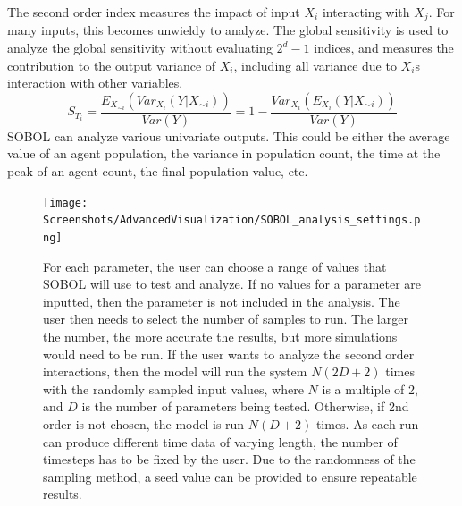 The second order index measures the impact of input $X_i$ interacting with $X_j$. For many inputs, this becomes unwieldy to analyze. 
The global sensitivity is used to analyze the global sensitivity without evaluating $2^d-1$ indices, and measures the contribution to the output variance of $X_i$, including all variance due to $X_i$s interaction with other variables. 
\[
    S_{T_i} = \frac{E_{X_{\sim i}}(Var_{X_i}(Y|X_{\sim i}))}{Var(Y)} = 1 - \frac{Var_{X_i}(E_{X_i}(Y|X_{\sim i}))}{Var(Y)}
\]
SOBOL can analyze various univariate outputs. 
This could be either the average value of an agent population, the variance in population count, the time at the peak of an agent count, the final population value, etc. 
\begin{figure}
    \centering
    \texttt{[image: Screenshots/AdvancedVisualization/SOBOL\_analysis\_settings.png]}
    \caption{
		For each parameter, the user can choose a range of values that SOBOL will use to test and analyze. 
		If no values for a parameter are inputted, then the parameter is not included in the analysis. 
		The user then needs to select the number of samples to run. 
        The larger the number, the more accurate the results, but more simulations would need to be run. 
        If the user wants to analyze the second order interactions, then the model will run the system $N(2D+2)$ times with the randomly sampled input values, where $N$ is a multiple of 2, and $D$ is the number of parameters being tested. 
        Otherwise, if 2nd order is not chosen, the model is run $N(D+2)$ times. 
        As each run can produce different time data of varying length, the number of timesteps has to be fixed by the user. 
        Due to the randomness of the sampling method, a seed value can be provided to ensure repeatable results. 
    }
    \label{fig:ss:av:SOBOL_analysis_settings}
\end{figure}

